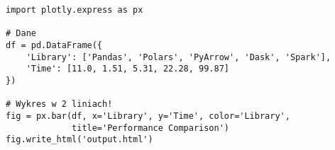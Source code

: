 
% 
% 



\begin{lstlisting}[caption={Plotly Express - Wykres słupkowy (8 LOC)},label={lst:plotly_simple}]
import plotly.express as px

# Dane
df = pd.DataFrame({
    'Library': ['Pandas', 'Polars', 'PyArrow', 'Dask', 'Spark'],
    'Time': [11.0, 1.51, 5.31, 22.28, 99.87]
})

# Wykres w 2 liniach!
fig = px.bar(df, x='Library', y='Time', color='Library',
             title='Performance Comparison')
fig.write_html('output.html')
\end{lstlisting}




